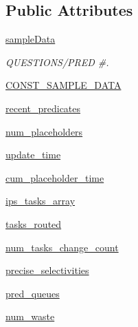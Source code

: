 \subsection*{Public Attributes}
\begin{DoxyCompactItemize}
\item 
\hyperlink{classdynamicfilterapp_1_1test__simulations_1_1_simulation_test_a4ab28c61e1d11d91140b32be9fec0af8}{sample\+Data}
\begin{DoxyCompactList}\small\item\em Q\+U\+E\+S\+T\+I\+O\+N\+S/\+P\+R\+ED \#. \end{DoxyCompactList}\item 
\hyperlink{classdynamicfilterapp_1_1test__simulations_1_1_simulation_test_ab5fa627b88e4ce7c247f5e7c9680386e}{C\+O\+N\+S\+T\+\_\+\+S\+A\+M\+P\+L\+E\+\_\+\+D\+A\+TA}
\item 
\hyperlink{classdynamicfilterapp_1_1test__simulations_1_1_simulation_test_aa35f53b06211af338f382ceb3de64564}{recent\+\_\+predicates}
\item 
\hyperlink{classdynamicfilterapp_1_1test__simulations_1_1_simulation_test_a8df699f4f7e003ed76896120d241ec44}{num\+\_\+placeholders}
\item 
\hyperlink{classdynamicfilterapp_1_1test__simulations_1_1_simulation_test_ae989b8400163febdffa0d452c256edd4}{update\+\_\+time}
\item 
\hyperlink{classdynamicfilterapp_1_1test__simulations_1_1_simulation_test_ac5deee7873cfc1e9e8c2190d2e165bc7}{cum\+\_\+placeholder\+\_\+time}
\item 
\hyperlink{classdynamicfilterapp_1_1test__simulations_1_1_simulation_test_a4a08524fd307d06eeb927b9201284433}{ips\+\_\+tasks\+\_\+array}
\item 
\hyperlink{classdynamicfilterapp_1_1test__simulations_1_1_simulation_test_ac272684d310568f016d065b280e41d33}{tasks\+\_\+routed}
\item 
\hyperlink{classdynamicfilterapp_1_1test__simulations_1_1_simulation_test_a782fa7450f2f94924a3170689bdf5d39}{num\+\_\+tasks\+\_\+change\+\_\+count}
\item 
\hyperlink{classdynamicfilterapp_1_1test__simulations_1_1_simulation_test_ac31632c95ded6ca45f6cc4d9b7960dc5}{precise\+\_\+selectivities}
\item 
\hyperlink{classdynamicfilterapp_1_1test__simulations_1_1_simulation_test_a1f9c704f13a96f3bf7811d2101c296e8}{pred\+\_\+queues}
\item 
\hyperlink{classdynamicfilterapp_1_1test__simulations_1_1_simulation_test_ae8fdee065a87647f4ffea7fd5c958110}{num\+\_\+waste}

\end{DoxyCompactItemize}
